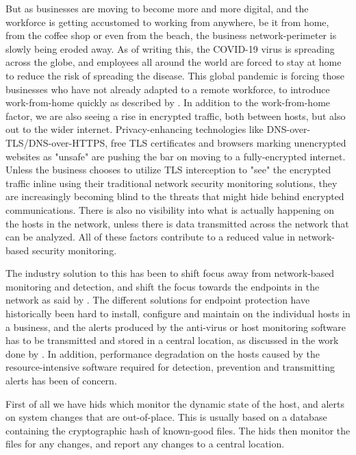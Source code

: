 But as businesses are moving to become more and more digital, and the workforce is getting accustomed to working from anywhere, be it from home, from the coffee shop or even from the beach, the business network-perimeter is slowly being eroded away.
As of writing this, the COVID-19 virus is spreading across the globe, and employees all around the world are forced to stay at home to reduce the risk of spreading the disease. This global pandemic is forcing those businesses who have not already adapted to a remote workforce, to introduce work-from-home quickly as described by \textcite{kramer_2020}.
In addition to the work-from-home factor, we are also seeing a rise in encrypted traffic, both between hosts, but also out to the wider internet. Privacy-enhancing technologies like DNS-over-TLS/DNS-over-HTTPS, free TLS certificates and browsers marking unencrypted websites as "unsafe" are pushing the bar on moving to a fully-encrypted internet. Unless the business chooses to utilize TLS interception to "see" the encrypted traffic inline using their traditional network security monitoring solutions, they are increasingly becoming blind to the threats that might hide behind encrypted communications. There is also no visibility into what is actually happening on the hosts in the network, unless there is data transmitted across the network that can be analyzed. All of these factors contribute to a reduced value in network-based security monitoring.

The industry solution to this has been to shift focus away from network-based monitoring and detection, and shift the focus towards the endpoints in the network as said by \textcite{liu_2019}. The different solutions for endpoint protection have historically been hard to install, configure and maintain on the individual hosts in a business, and the alerts produced by the anti-virus or host monitoring software has to be transmitted and stored in a central location, as discussed in the work done by \textcite{brattstrom_2017}. In addition, performance degradation on the hosts caused by the resource-intensive software required for detection, prevention and transmitting alerts has been of concern.

First of all we have \acrfull{hids} which monitor the dynamic state of the host, and alerts on system changes that are out-of-place. This is usually based on a database containing the cryptographic hash of known-good files. The \acrshort{hids} then monitor the files for any changes, and report any changes to a central location.

